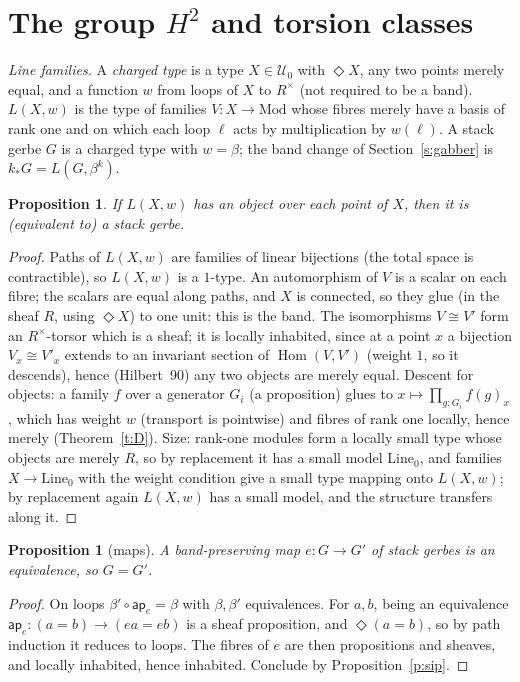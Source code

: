 \documentclass[11pt]{amsart}
\newtheorem{proposition}[theorem]{Proposition}
\theoremstyle{definition}
\theoremstyle{remark}
\newcommand{\Hom}{\operatorname{Hom}}
\newcommand{\close}{\Diamond}
\newcommand{\Rx}{R^\times}
\newcommand{\U}{\mathcal U}
\newcommand{\ap}{\mathsf{ap}}
\begin{document}
\section{The group $H^2$ and torsion classes}\label{s:group}

\emph{Line families.} A \emph{charged type} is a type $X\in\U_0$ with
$\close X$, any two points merely equal, and a function $w$ from loops of
$X$ to $\Rx$ (not required to be a band). $L(X,w)$ is the type of families
$V:X\to\mathrm{Mod}$ whose fibres merely have a basis of rank one and on
which each loop $\ell$ acts by multiplication by $w(\ell)$. A stack gerbe
$G$ is a charged type with $w=\beta$; the band change of
Section~\ref{s:gabber} is $k_*G=L(G,\beta^k)$.

\begin{proposition}\label{p:lines}
If $L(X,w)$ has an object over each point of $X$, then it is (equivalent to)
a stack gerbe.
\end{proposition}
\begin{proof}
Paths of $L(X,w)$ are families of linear bijections (the total space is
contractible), so $L(X,w)$ is a $1$-type. An automorphism of $V$ is a
scalar on each fibre; the scalars are equal along paths, and $X$ is
connected, so they glue (in the sheaf $R$, using $\close X$) to one unit:
this is the band. The isomorphisms $V\cong V'$ form an $\Rx$-torsor which is
a sheaf; it is locally inhabited, since at a point $x$ a bijection
$V_x\cong V'_x$ extends to an invariant section of $\Hom(V,V')$ (weight
$1$, so it descends), hence (Hilbert~90) any two objects are merely equal.
Descent for objects: a family $f$ over a generator $G_i$ (a proposition)
glues to $x\mapsto\prod_{g:G_i}f(g)_x$, which has weight $w$ (transport is
pointwise) and fibres of rank one locally, hence merely
(Theorem~\ref{t:D}). Size: rank-one modules form a locally small type
whose objects are merely $R$, so by replacement it has a small model
$\mathrm{Line}_0$, and families $X\to\mathrm{Line}_0$ with the weight
condition give a small type mapping onto $L(X,w)$; by replacement again
$L(X,w)$ has a small model, and the structure transfers along it.
\end{proof}

\begin{proposition}[maps]\label{p:maps}
A band-preserving map $e:G\to G'$ of stack gerbes is an equivalence, so
$G=G'$.
\end{proposition}
\begin{proof}
On loops $\beta'\circ\ap_e=\beta$ with $\beta,\beta'$ equivalences. For
$a,b$, being an equivalence $\ap_e:(a=b)\to(ea=eb)$ is a sheaf proposition,
and $\close(a=b)$, so by path induction it reduces to loops. The fibres of
$e$ are then propositions and sheaves, and locally inhabited, hence
inhabited. Conclude by Proposition~\ref{p:sip}.
\end{proof}
\end{document}
